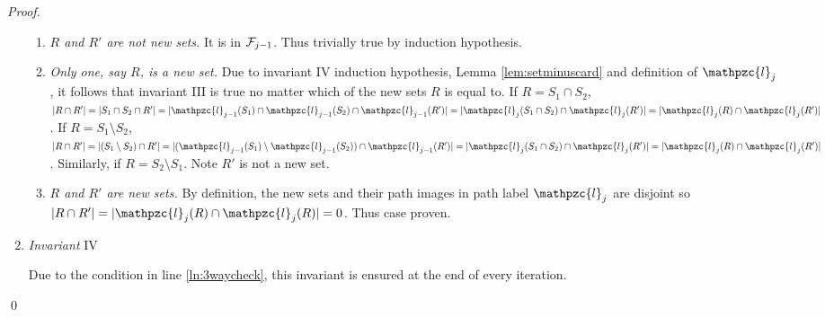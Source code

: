 \documentclass[11pt,letter]{../lib/llncs}
\def\cF{{\cal F}}
\def\cl{\mathpzc{l}}
\begin{document}
\begin{proof}
\begin{enumerate}[\textreferencemark]
\begin{enumerate}[{III}a $|$]
    \item {\em $R$ and $R'$ are not new sets.} It is in
      $\cF_{j-1}$. Thus trivially true by induction hypothesis.
    \item {\em Only one, say $R$, is a new set.} Due to invariant IV
      induction hypothesis, Lemma \ref{lem:setminuscard} and
      definition of $\cl_j$, it follows that invariant III is true no
      matter which of the new sets $R$ is equal to. If $R = S_1 \cap
      S_2$, $|R \cap R'| = |S_1 \cap S_2 \cap R'| = |\cl_{j-1}(S_1)
      \cap \cl_{j-1}(S_2) \cap \cl_{j-1}(R')| = |\cl_j(S_1 \cap S_2)
      \cap \cl_j(R')| = |\cl_j(R) \cap \cl_j(R')|$.  If $R = S_1
      \setminus S_2$, $|R \cap R'| = |(S_1 \setminus S_2) \cap R'| =
      |(\cl_{j-1}(S_1) \setminus \cl_{j-1}(S_2)) \cap \cl_{j-1}(R')| =
      |\cl_{j}(S_1 \cap S_2) \cap \cl_{j}(R')| = |\cl_{j}(R) \cap
      \cl_{j}(R')|$. Similarly, if $R = S_2 \setminus
      S_1$. Note $R'$ is not a new set.\\

    \item {\em $R$ and $R'$ are new sets.} By definition, the new
      sets and their path images in path label $\cl_j$ are disjoint so
      $|R \cap R'| = |\cl_j(R) \cap \cl_j(R)| = 0$. Thus case proven.
    \end{enumerate}
  \item {\em Invariant} IV
    
    Due to the condition in line \ref{ln:3waycheck}, this invariant is
    ensured at the end of every iteration.
  \end{enumerate} 
\vspace{-6mm} 
\qed
\end{proof}
\end{document}
